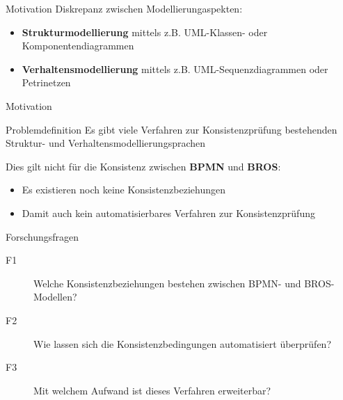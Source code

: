 \begin{frame}{Motivation}
  Diskrepanz zwischen Modellierungaspekten:

  \begin{itemize}
    \item \textbf{Strukturmodellierung} mittels z.B. UML-Klassen- oder Komponentendiagrammen 

    \item \textbf{Verhaltensmodellierung} mittels z.B. UML-Sequenzdiagrammen oder Petrinetzen
  \end{itemize}
\end{frame}
\begin{frame}{Motivation}
  
\end{frame}

\begin{frame}{Problemdefinition}
  Es gibt viele Verfahren zur Konsistenzprüfung bestehenden Struktur- und Verhaltensmodellierungsprachen

  Dies gilt nicht für die Konsistenz zwischen \textbf{BPMN} und \textbf{BROS}:

  \begin{itemize}
    \item Es existieren noch keine Konsistenzbeziehungen

    \item Damit auch kein automatisierbares Verfahren zur Konsistenzprüfung
  \end{itemize}
\end{frame}
\begin{frame}{Forschungsfragen}
  \begin{description}
    \item[F1] Welche Konsistenzbeziehungen bestehen zwischen BPMN- und BROS-Modellen?

    \item[F2] Wie lassen sich die Konsistenzbedingungen automatisiert überprüfen?

    \item[F3] Mit welchem Aufwand ist dieses Verfahren erweiterbar?
  \end{description}
\end{frame}
